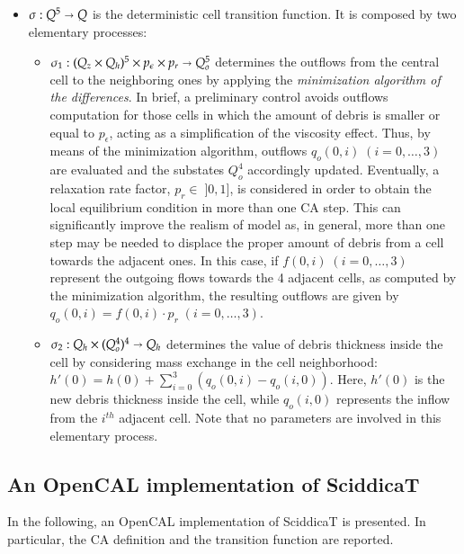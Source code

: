 \begin{itemize}
\item $\sigma : Q^5 \shortrightarrow Q$ is the deterministic cell
  transition function. It is composed by two elementary processes:
\begin{itemize}
\item $\sigma_1 : (Q_z \times Q_h)^5 \times p_\epsilon \times
  p_r\shortrightarrow Q_o^5$ determines the outflows from the central
  cell to the neighboring ones by applying the \emph{minimization
    algorithm of the differences}. In brief, a preliminary control
  avoids outflows computation for those cells in which the amount of
  debris is smaller or equal to $p_\epsilon$, acting as a
  simplification of the viscosity effect. Thus, by means of the
  minimization algorithm, outflows $q_o(0,i) \; (i=0,\ldots,3)$ are
  evaluated and the substates $Q_o^4$ accordingly updated.
  Eventually, a relaxation rate factor, $p_r \in \; ]0,1]$, is
      considered in order to obtain the local equilibrium condition in
      more than one CA step. This can significantly improve the
      realism of model as, in general, more than one step may be
      needed to displace the proper amount of debris from a cell
      towards the adjacent ones. In this case, if $f(0,i) \; (i=0,
      \ldots, 3)$ represent the outgoing flows towards the 4 adjacent
      cells, as computed by the minimization algorithm, the resulting
      outflows are given by $q_o(0,i)=f(0,i) \cdot p_r \; (i=0,
      \ldots, 3)$.


\item $\sigma_2: Q_h \times (Q_o^4)^4 \shortrightarrow Q_h$ determines
  the value of debris thickness inside the cell by considering mass
  exchange in the cell neighborhood: $h'(0) = h(0) + \sum_{i=0}^3
  (q_o(0,i) - q_o(i,0))$. Here, $h'(0)$ is the new debris
  thickness inside the cell, while $q_o(i,0)$ represents the inflow from
  the $i^{th}$ adjacent cell. Note that no parameters are involved in
  this elementary process.

\end{itemize}
\end{itemize}

\subsection{An OpenCAL implementation of SciddicaT}
In the following, an OpenCAL implementation of SciddicaT is
presented. In particular, the CA definition and the transition
function are reported.

